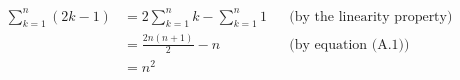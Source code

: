 \liftdisplaystyle
\begin{align*}
    \sum_{k=1}^n(2k-1) &= 2\sum_{k=1}^nk-\sum_{k=1}^n1 && \text{(by the linearity property)} \\[1mm]
    &= \frac{2n(n+1)}{2}-n && \text{(by equation (A.1))} \\
    &= n^2
\end{align*}
